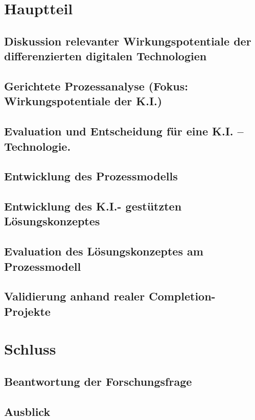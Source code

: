 \documentclass[11pt,a4paper,english]{article} %
\begin{document}
\newpage

\section{Hauptteil}

\subsection{Diskussion relevanter Wirkungspotentiale der differenzierten digitalen Technologien}

\subsection{Gerichtete Prozessanalyse (Fokus: Wirkungspotentiale der K.I.)}

\subsection{Evaluation und Entscheidung für eine K.I. – Technologie.}

\subsection{Entwicklung des Prozessmodells}

\subsection{Entwicklung des K.I.- gestützten Lösungskonzeptes}

\subsection{Evaluation des Lösungskonzeptes am Prozessmodell}

\subsection{Validierung anhand realer Completion-Projekte}

\newpage

\section{Schluss}

\subsection{Beantwortung der Forschungsfrage}

\subsection{Ausblick}

\newpage
\printbibliography
\end{document}
